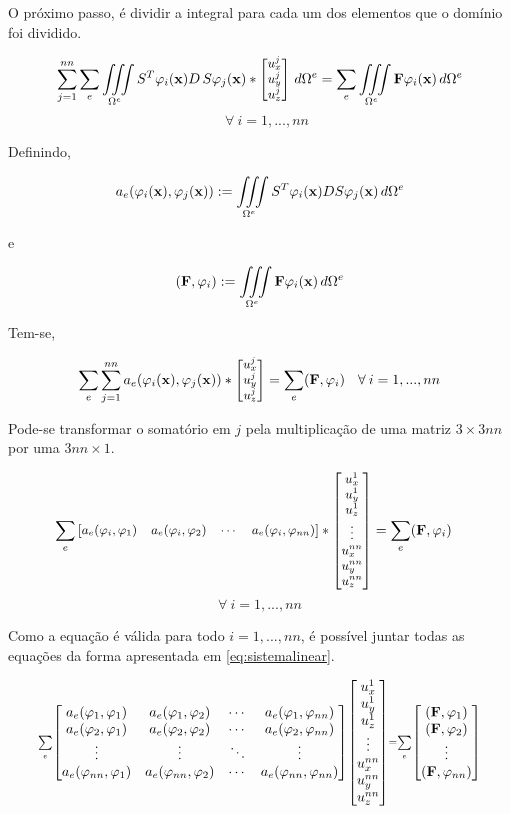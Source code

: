 O próximo passo, é dividir a integral para cada um dos elementos que o domínio foi dividido.

\begin{equation*}\small
\sum_{j=1}^{nn} \sum\limits_e \iiint\limits_{\Omega^e} S^T \varphi_i(\mathbf{x}) D\,S  \varphi_j(\mathbf{x})
 * \begin{bmatrix} u^j_x \\ u^j_y \\ u^j_z \end{bmatrix}
 \, d\Omega^e   =  \sum\limits_e \iiint\limits_{\Omega^e} \mathbf{F}\varphi_i(\mathbf{x}) \, d\Omega^e
\end{equation*}
\begin{equation*}
 \quad \forall \: i=1,...,nn
\end{equation*}

Definindo,

\begin{equation} \label{eq:ae_def}
 a_e(\varphi_i(\mathbf{x}),\varphi_j(\mathbf{x})) := \iiint\limits_{\Omega^e} S^T\varphi_i(\mathbf{x}) D S\varphi_j(\mathbf{x}) \, d\Omega^e
\end{equation}

e

\begin{equation}
(\mathbf{F}, \varphi_{i}) := \iiint\limits_{\Omega^e} \mathbf{F}\varphi_i(\mathbf{x}) \, d\Omega^e
\end{equation}

Tem-se,

\begin{equation}\small
\sum\limits_e \sum_{j=1}^{nn} a_e(\varphi_i(\mathbf{x}),\varphi_j(\mathbf{x}))  * \begin{bmatrix} u^j_x \\ u^j_y \\ u^j_z \end{bmatrix}
=  \sum\limits_e (\mathbf{F}, \varphi_{i}) \quad \forall \: i=1,...,nn
\end{equation}


Pode-se transformar o somatório em $j$ pela multiplicação de uma matriz $3\times3nn$ por uma $3nn\times1$.

\begin{equation}\small
\sum\limits_e  \begin{bmatrix} a_e(\varphi_{i}, \varphi_{1}) & a_e(\varphi_{i}, \varphi_{2}) & \cdots & a_e(\varphi_{i}, \varphi_{nn}) \end{bmatrix}  * \begin{bmatrix} u^{1}_x \\ u^{1}_y \\ u^{1}_z \\ \vdots\\ u^{nn}_x \\ u^{nn}_y \\ u^{nn}_z \end{bmatrix}
=  \sum\limits_e (\mathbf{F}, \varphi_{i}) \quad
\end{equation}
\begin{equation*}
  \forall \: i=1,...,nn
\end{equation*}


Como a equação é válida para todo $i=1,...,nn$, é possível juntar todas as equações da forma apresentada em \ref{eq:sistemalinear}.

\begin{equation}\scriptstyle
\sum\limits_e\aemat\libvetor = \sum\limits_e \begin{bmatrix}
\ldint[1] \\
\ldint[2] \\
\vdots    \\
\ldint[nn]
\end{bmatrix}
\label{eq:sistemalinear}
\end{equation}

